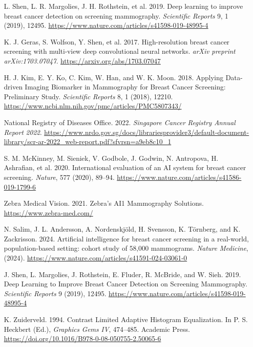 \documentclass[12pt]{article}
\begin{document}
\begin{thebibliography}{99}
    L. Shen, L. R. Margolies, J. H. Rothstein, et al. 2019. Deep learning to improve breast cancer detection on screening mammography. \textit{Scientific Reports} 9, 1 (2019), 12495. \url{https://www.nature.com/articles/s41598-019-48995-4}
    
    K. J. Geras, S. Wolfson, Y. Shen, et al. 2017. High-resolution breast cancer screening with multi-view deep convolutional neural networks. \textit{arXiv preprint arXiv:1703.07047}. \url{https://arxiv.org/abs/1703.07047}
    
    H. J. Kim, E. Y. Ko, C. Kim, W. Han, and W. K. Moon. 2018. Applying Data-driven Imaging Biomarker in Mammography for Breast Cancer Screening: Preliminary Study. \textit{Scientific Reports} 8, 1 (2018), 12210. \url{https://www.ncbi.nlm.nih.gov/pmc/articles/PMC5807343/}
    
    National Registry of Diseases Office. 2022. \textit{Singapore Cancer Registry Annual Report 2022}. \url{https://www.nrdo.gov.sg/docs/librariesprovider3/default-document-library/scr-ar-2022_web-report.pdf?sfvrsn=a9eb8c10_1}

    S. M. McKinney, M. Sieniek, V. Godbole, J. Godwin, N. Antropova, H. Ashrafian, et al. 2020. International evaluation of an AI system for breast cancer screening. \textit{Nature}, 577 (2020), 89–94. \url{https://www.nature.com/articles/s41586-019-1799-6}

    Zebra Medical Vision. 2021. Zebra’s AI1 Mammography Solutions. \url{https://www.zebra-med.com/}

    N. Salim, J. L. Andersson, A. Nordenskjöld, H. Svensson, K. Törnberg, and K. Zackrisson. 2024. Artificial intelligence for breast cancer screening in a real-world, population-based setting: cohort study of 58,000 mammograms. \textit{Nature Medicine}, (2024). \url{https://www.nature.com/articles/s41591-024-03061-0}

    J. Shen, L. Margolies, J. Rothstein, E. Fluder, R. McBride, and W. Sieh. 2019. Deep Learning to Improve Breast Cancer Detection on Screening Mammography. \textit{Scientific Reports} 9 (2019), 12495. \url{https://www.nature.com/articles/s41598-019-48995-4}

    K. Zuiderveld. 1994. Contrast Limited Adaptive Histogram Equalization. In P. S. Heckbert (Ed.), \textit{Graphics Gems IV}, 474–485. Academic Press. \url{https://doi.org/10.1016/B978-0-08-050755-2.50065-6}


\end{thebibliography}
\end{document}
